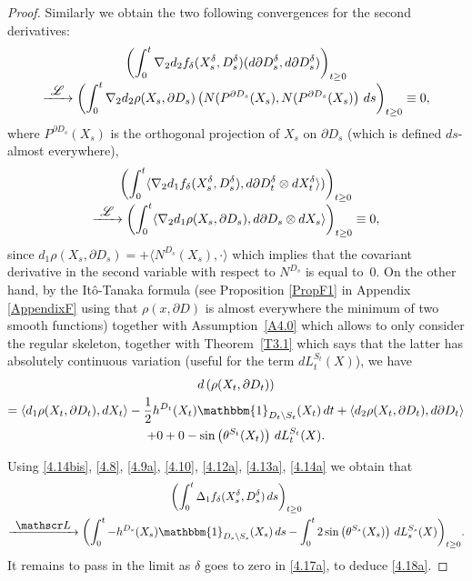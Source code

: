 \documentclass[JEP,XML,SOM,Unicode,NoFloatCountersInSection,published]{cedram}
\let\backslash\setminus
\newcommand\To[1]{\mathchoice{\xrightarrow{\textstyle\kern4pt#1\kern3pt}}{\stackrel{#1}{\longrightarrow}}{}{}}
\theoremstyle{plain}
\theoremstyle{definition}
\newcommand{\SL}{{\mathscr L}}
\newcommand{\un}{\mathbbm{1}}
\let\f\frac
\let\D\Delta
\let\d\delta
\let\n\nabla
\begin{document}
\begin{proof}
Similarly we obtain the two following convergences for the second derivatives:\vspace*{-5pt}
\begin{multline}
\label{4.12a}
\biggl(\int_0^t \n_2d_2f_\d(X_s^\d, D_s^\d)(d\partial D_s^\d,d\partial D_s^\d)\biggr)_{t\ge 0}\\[-3pt]
\To{\SL}\biggl(\int_0^t \n_2d_2\rho(X_s, \partial D_s)\left(N(P^{\partial D_s}(X_s),N(P^{\partial D_s}(X_s)\right)\,ds\biggr)_{t\ge 0}\equiv 0,
\end{multline}
where $P^{\partial D_s}(X_s)$ is the orthogonal projection of $X_s$ on $\partial D_s$ (which is defined $ds$-almost everywhere),\vspace*{-5pt}
\begin{multline}
\label{4.13a}
\biggl(\int_0^t \langle \n_{2}d_1f_\d(X_s^\d, D_s^\d), d\partial D_t^\d \otimes dX_t^\d\rangle )\biggr)_{t\ge 0}\\[-3pt]
\To{\SL}\biggl(\int_0^t \langle \n_{2}d_1\rho (X_s,\partial D_s), d\partial D_s\otimes dX_s\rangle\biggr)_{t\ge 0}\equiv 0,
\end{multline}
since $d_1\rho(X_s, \partial D_s)= +\langle N^{D_s}(X_s),\cdot \rangle$ which implies that the covariant derivative in the second variable with respect to $N^{D_s}$ is equal to~$0$.
On the other hand, by the Itô-Tanaka formula
(see Proposition \ref{PropF1} in Appendix \ref{AppendixF}
using that $\rho(x,\partial D)$ is almost everywhere the minimum of two smooth functions) together with Assumption~\ref{A4.0} which allows to only consider the regular skeleton, together with Theorem~\ref{T3.1} which says that the latter has absolutely continuous variation (useful for the term $dL_t^{S_t}(X)$),
we have
\begin{multline}
\label{4.14a}
d\left(\rho(X_t,\partial D_t)\right)\\
=
\langle d_1\rho (X_t,\partial D_t), dX_t\rangle -\f12h^{D_t}(X_t)\un_{D_t \backslash S_t}(X_t) \,dt+\langle d_2\rho (X_t,\partial D_t), d\partial D_t\rangle\\
+0+0-\sin\left(\theta^{S_t}(X_t)\right)\,dL_t^{S_t}(X).
\end{multline}

Using \eqref{4.14bis}, \eqref{4.8}, \eqref{4.9a}, \eqref{4.10}, \eqref{4.12a}, \eqref{4.13a}, \eqref{4.14a} we obtain that
\begin{multline}
\label{4.16a}
\biggl(\int_0^t \D_1f_\d(X_s^\d, D_s^\d)\, ds\biggr)_{t\ge 0}\\
\To{\SL}\biggl(\int_0^t -h^{D_s} (X_s) \un_{D_s \backslash S_s}(X_s) \, ds-\int_0^t2\sin\left(\theta^{S_s}(X_s)\right)\,dL_s^{S_s}(X) \biggr)_{t\ge 0}.
\end{multline}
It remains to pass in the limit as $\d$ goes to zero in \eqref{4.17a}, to deduce \eqref{4.18a}.
\end{proof}
\end{document}
